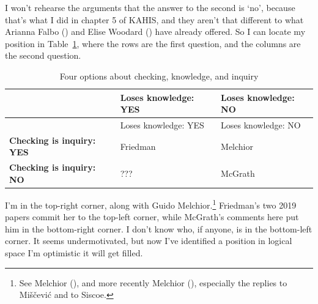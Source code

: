 \documentclass[
  11pt,
  letterpaper,
  DIV=11,
  numbers=noendperiod,
  twoside]{scrartcl}
\begin{document}
I won't rehearse the arguments that the answer to the second is `no',
because that's what I did in chapter 5 of KAHIS, and they aren't that
different to what Arianna Falbo () and
Elise Woodard () have already offered.
So I can locate my position in Table~\ref{tbl-checking}, where the rows
are the first question, and the columns are the second question.

\begin{longtable}[]{@{}
  >{\raggedright\arraybackslash}p{}
  >{\raggedright\arraybackslash}p{}
  >{\raggedright\arraybackslash}p{}@{}}
\caption{Four options about checking, knowledge, and
inquiry}\label{tbl-checking}\tabularnewline
\toprule\noalign{}
\begin{minipage}[b]{\linewidth}\raggedright
\end{minipage} & \begin{minipage}[b]{\linewidth}\raggedright
Loses knowledge: YES
\end{minipage} & \begin{minipage}[b]{\linewidth}\raggedright
Loses knowledge: NO
\end{minipage} \\
\midrule\noalign{}
\endfirsthead
\toprule\noalign{}
\begin{minipage}[b]{\linewidth}\raggedright
\end{minipage} & \begin{minipage}[b]{\linewidth}\raggedright
Loses knowledge: YES
\end{minipage} & \begin{minipage}[b]{\linewidth}\raggedright
Loses knowledge: NO
\end{minipage} \\
\midrule\noalign{}
\endhead
\bottomrule\noalign{}
\endlastfoot
\textbf{Checking is inquiry: YES} & Friedman & Melchior \\
\textbf{Checking is inquiry: NO} & ??? & McGrath \\
\end{longtable}

I'm in the top-right corner, along with Guido Melchior.\footnote{See
  Melchior (), and more recently
  Melchior (), especially the replies
  to Miščević and to Siscoe.} Friedman's two 2019 papers commit her to
the top-left corner, while McGrath's comments here put him in the
bottom-right corner. I don't know who, if anyone, is in the bottom-left
corner. It seems undermotivated, but now I've identified a position in
logical space I'm optimistic it will get filled.
\end{document}
